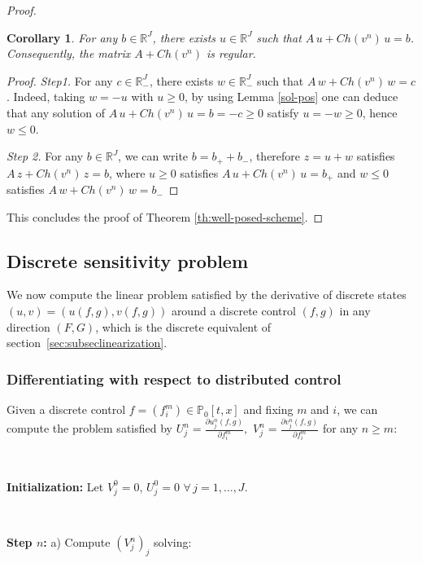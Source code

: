 \documentclass[11pt]{article}
\newtheorem{corollary}[theorem]{Corollary}
\numberwithin{theorem}{section}
\begin{document}
\begin{proof}
 
 \begin{corollary}  For any $b\in \mathbb{R}^J$, there exists $u\in \mathbb{R}^J$ such that $A\, u+Ch(v^n)\, u =b$. Consequently, the matrix $A+ Ch(v^n) $ is regular.
  \end{corollary}
 
  \begin{proof} {\it Step1.} For any $c\in \mathbb{R}^J_-$, there exists $w\in \mathbb{R}^J_-$ such that $A\, w+Ch(v^n)\, w =c$. Indeed, taking $w=-u$ with $u\ge 0$, by using Lemma \ref{sol-pos} one can deduce that any solution of $A\, u+Ch(v^n)\, u =b=-c\ge 0$ satisfy $u=-w\geq0$, hence $w\leq0$.
  
 {\it  Step 2.} For any $b\in \mathbb{R}^J$, we can write $b=b_+ + b_-$, therefore $z=u+w$ satisfies $A\, z+Ch(v^n)\, z =b$, where $u\ge 0$ satisfies $A\, u+Ch(v^n)\, u =b_+$ and  $w\le 0$ satisfies $A\, w+Ch(v^n)\, w =b_-$
  \end{proof} 
  This concludes the proof of Theorem \ref{th:well-posed-scheme}.
  \end{proof} 

\subsection{Discrete sensitivity problem}

We  now compute the linear problem satisfied by the derivative of discrete states  $(u,v)=(u(f,g),v(f,g))$ around a discrete control $(f,g)$ in any direction $(F,G)$, which is the discrete equivalent of section~\ref{sec:subseclinearization}.

\subsubsection{Differentiating with respect to distributed control}

Given a discrete control $f=(f^m_i)\in\mathbb{P}_0[t,x]$ and  
fixing $m$ and $i$, 
we can compute the problem satisfied by $\displaystyle U^n_j=\frac{\partial u^n_j(f,g)}{\partial f^m_i},$ $\displaystyle V^n_j=\frac{\partial v^n_j(f,g)}{\partial f^m_i}$ for any $n\ge m$: 

\

\textbf{Initialization:}
Let $V_j^0=0$,  $U_j^0=0$ $\forall\, j=1,\dots,J.$

\

\textbf{Step $n$:} a) Compute $(V_j^n)_j$ solving:
\end{document}
